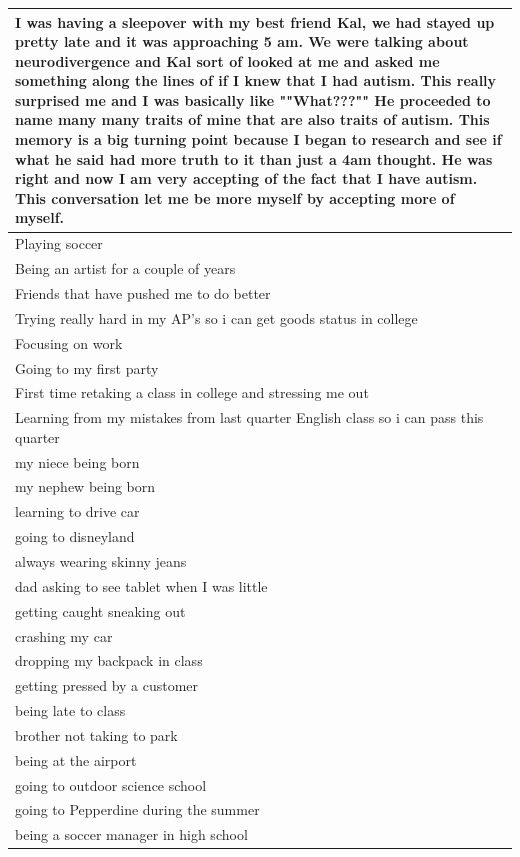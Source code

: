 \documentclass[
  .7em,
  letterpaper,
  DIV=11,
  numbers=noendperiod]{scrartcl}
\begin{document}
\begin{table}
\begin{tabular}{l}
\hline
I was having a sleepover with my best friend Kal, we had stayed up pretty late and it was approaching 5 am. We were talking about neurodivergence and Kal sort of looked at me and asked me something along the lines of if I knew that I had autism. This really surprised me and I was basically like ""What???"" He proceeded to name many many traits of mine that are also traits of autism. This memory is a big turning point because I began to research and see if what he said had more truth to it than just a 4am thought. He was right and now I am very accepting of the fact that I have autism. This conversation let me be more myself by accepting more of myself.\\
\hline
Playing soccer\\
\hline
Being an artist for a couple of years\\
\hline
Friends that have pushed me to do better\\
\hline
Trying really hard in my AP's so i can get goods status in college\\
\hline
Focusing on work\\
\hline
Going to my first party\\
\hline
First time retaking a class in college and stressing me out\\
\hline
Learning from my mistakes from last quarter English class so i can pass this quarter\\
\hline
my niece being born\\
\hline
my nephew being born\\
\hline
learning to drive car\\
\hline
going to disneyland\\
\hline
always wearing skinny jeans\\
\hline
dad asking to see tablet when I was little\\
\hline
getting caught sneaking out\\
\hline
crashing my car\\
\hline
dropping my backpack in class\\
\hline
getting pressed by a customer\\
\hline
being late to class\\
\hline
brother not taking to park\\
\hline
being at the airport\\
\hline
going to outdoor science school\\
\hline
going to Pepperdine during the summer\\
\hline
being a soccer manager in high school\\

\end{tabular}
\end{table}
\end{document}
